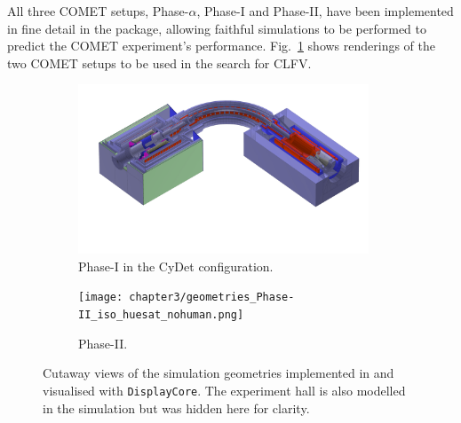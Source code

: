 

All three COMET setups, Phase-$\alpha$, Phase-I and Phase-II, have been implemented in fine detail in the \SimG package, allowing faithful simulations to be performed to predict the COMET experiment's performance. %
Fig.~\ref{fig:comet_geometries} shows renderings of the two COMET setups to be used in the search for CLFV.

\begin{figure}
    \centering
    \captionsetup[subfigure]{justification=centering}
    \begin{subfigure}[t]{0.49\textwidth}
        \centering
        \includegraphics[width=0.95\textwidth]{chapter3/geometries_Phase-I_iso_cropless_huesat.png}
        \caption{Phase-I in the CyDet configuration.}
    \end{subfigure}
    \hfill
    \begin{subfigure}[t]{0.49\textwidth}
        \centering
        \texttt{[image: chapter3/geometries\_Phase-II\_iso\_huesat\_nohuman.png]}
        \caption{Phase-II.}
    \end{subfigure}
    
    \caption{Cutaway views of the simulation geometries implemented in \SimG and visualised with \texttt{DisplayCore}. The experiment hall is also modelled in the simulation but was hidden here for clarity.}
    \label{fig:comet_geometries}
\end{figure}


